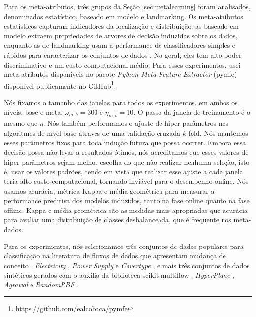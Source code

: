 Para os meta-atributos, três grupos da Seção \ref{sec:metalearning} foram analisados, denominados estatístico, baseado em modelo e landmarking. Os meta-atributos estatísticos capturam indicadores da localização e distribuição, as baseado em modelo extraem propriedades de arvores de decisão induzidas sobre os dados, enquanto as de landmarking usam a performance de classificadores simples e rápidos para caracterizar os conjuntos de dados \cite{Rivolli2018}. No geral, eles tem alto poder discriminativo e um custo computacional médio. Para esses experimentos, usei meta-atributos disponíveis no pacote \textit{Python Meta-Feature Extractor} (pymfe) \cite{pymfe2020} disponível publicamente no GitHub\footnote{\url{https://github.com/ealcobaca/pymfe}}.

Nós fixamos o tamanho das janelas para todos os experimentos, em ambos os níveis, base e meta,
$\omega_{m;b} = 300$ e $\eta_{m;b} = 10$. O passo da janela de treinamento é o mesmo que $\eta$.
Nós também performamos o ajuste de hiper-parâmetros nos algoritmos de nível base através de uma
validação cruzada $k$-fold. Nós mantemos esses parâmetros fixos para toda indução futura que possa
ocorrer. Embora essa decisão possa não levar a resultados ótimos, nós acreditamos que esses 
valores de hiper-parâmetros sejam melhor escolha do que não realizar nenhuma seleção, isto é,
usar os valores padrões, tendo em vista que realizar esse ajuste a cada janela teria alto custo computacional, tornando inviável para o desempenho online. Nós usamos acurácia, métrica Kappa e
média geométrica para mensurar a performance preditiva dos modelos induzidos, tanto na fase online
quanto na fase offline. Kappa e média geométrica são as medidas mais apropriadas que acurácia
para avaliar uma distribuição de classes desbalanceada, que é frequente nos meta-dados.

Para os experimentos, nós selecionamos três conjuntos de dados populares para classificação na
literatura de fluxos de dados que apresentam mudança de conceito
\cite{vanrijn2014algorithm,read2012batch}, \textit{Electricity} \cite{gama2004learning},
\textit{Power Supply}\cite{zhu2010stream} e \textit{Covertype} \cite{blackard1998covertype},
e mais três conjuntos de dados sintéticos gerados com o auxilio da biblioteca scikit-multiflow
\cite{skmultiflow}, \textit{HyperPlane} \cite{hulten2001mining}, \textit{Agrawal}
\cite{agrawal1993database} e \textit{RandomRBF} \cite{skmultiflow}.


